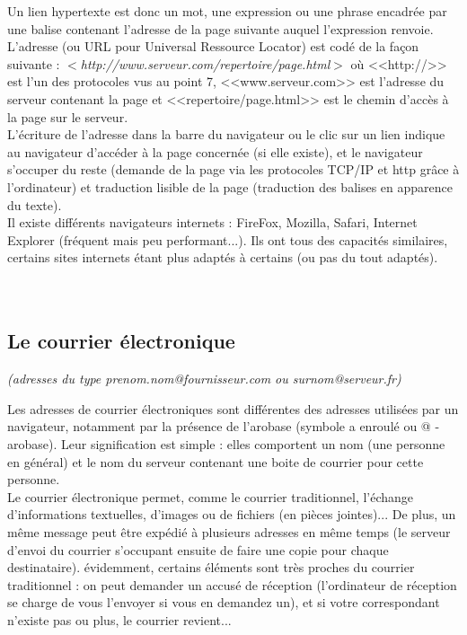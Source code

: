 \documentclass[11pt,twoside,a4paper]{article}
\begin{document}
		Un lien hypertexte est donc un mot, une expression ou une phrase encadr{\'e}e par une balise contenant l'adresse de la page suivante auquel l'expression renvoie. L'adresse (ou URL pour Universal Ressource Locator) est cod{\'e} de la fa\c{c}on suivante : $<$\emph{http://www.serveur.com/repertoire/page.html}$>$ o{\`u} <<http://>> est l'un des protocoles vus au point 7, <<www.serveur.com>> est l'adresse du serveur contenant la page et <<repertoire/page.html>> est le chemin d'acc{\`e}s {\`a} la page sur le serveur. ~\\

		L'{\'e}criture de l'adresse dans la barre du navigateur ou le clic sur un lien indique au navigateur d'acc{\'e}der {\`a} la page concern{\'e}e (si elle existe), et le navigateur s'occuper du reste (demande de la page via les protocoles TCP/IP et http gr{\^a}ce {\`a} l'ordinateur) et traduction lisible de la page (traduction des balises en apparence du texte). ~\\

		Il existe diff{\'e}rents navigateurs internets : FireFox, Mozilla, Safari, Internet Explorer (fr{\'e}quent mais peu performant...). Ils ont tous des capacit{\'e}s similaires, certains sites internets {\'e}tant plus adapt{\'e}s {\`a} certains (ou pas du tout adapt{\'e}s). ~\\~\\~\\

	\subsection{Le courrier {\'e}lectronique}
\textit{(adresses du type prenom.nom@fournisseur.com ou surnom@serveur.fr)}

			Les adresses de courrier {\'e}lectroniques sont diff{\'e}rentes des adresses utilis{\'e}es par un navigateur, notamment par la pr{\'e}sence de l'arobase (symbole a enroul{\'e} ou @ - arobase). Leur signification est simple : elles comportent un nom (une personne en g{\'e}n{\'e}ral) et le nom du serveur contenant une boite de courrier pour cette personne. ~\\

			Le courrier {\'e}lectronique permet, comme le courrier traditionnel, l'{\'e}change d'informations textuelles, d'images ou de fichiers (en pi{\`e}ces jointes)... De plus, un m{\^e}me message peut {\^e}tre exp{\'e}di{\'e} {\`a} plusieurs adresses en m{\^e}me temps (le serveur d'envoi du courrier s'occupant ensuite de faire une copie pour chaque destinataire). {\'e}videmment, certains {\'e}l{\'e}ments sont tr{\`e}s proches du courrier traditionnel : on peut demander un accus{\'e} de r{\'e}ception (l'ordinateur de r{\'e}ception se charge de vous l'envoyer si vous en demandez un), et si votre correspondant n'existe pas ou plus, le courrier revient...~\\
\end{document}
